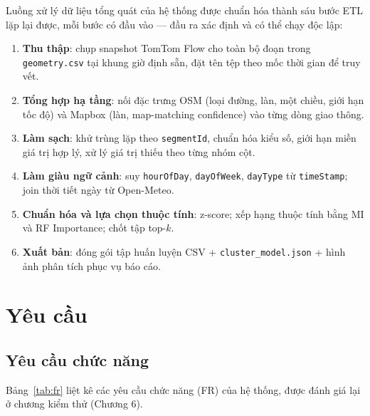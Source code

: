 Luồng xử lý dữ liệu tổng quát của hệ thống được chuẩn hóa thành sáu bước ETL lặp lại được, mỗi bước có đầu vào --- đầu ra xác định và có thể chạy độc lập:
\begin{enumerate}[label=\textbf{Bước \arabic*.},leftmargin=2.2cm,itemsep=1pt]
 \item \textbf{Thu thập}: chụp snapshot TomTom Flow cho toàn bộ đoạn trong \texttt{geometry.csv} tại khung giờ định sẵn, đặt tên tệp theo mốc thời gian để truy vết.
 \item \textbf{Tổng hợp hạ tầng}: nối đặc trưng OSM (loại đường, làn, một chiều, giới hạn tốc độ) và Mapbox (làn, map-matching confidence) vào từng dòng giao thông.
 \item \textbf{Làm sạch}: khử trùng lặp theo \texttt{segmentId}, chuẩn hóa kiểu số, giới hạn miền giá trị hợp lý, xử lý giá trị thiếu theo từng nhóm cột.
 \item \textbf{Làm giàu ngữ cảnh}: suy \texttt{hourOfDay}, \texttt{dayOfWeek}, \texttt{dayType} từ \texttt{timeStamp}; join thời tiết ngày từ Open-Meteo.
 \item \textbf{Chuẩn hóa và lựa chọn thuộc tính}: z-score; xếp hạng thuộc tính bằng MI và RF Importance; chốt tập top-$k$.
 \item \textbf{Xuất bản}: đóng gói tập huấn luyện CSV + \texttt{cluster\_model.json} + hình ảnh phân tích phục vụ báo cáo.
\end{enumerate}

\section{Yêu cầu}

\subsection{Yêu cầu chức năng}
Bảng~\ref{tab:fr} liệt kê các yêu cầu chức năng (FR) của hệ thống, được đánh giá lại ở chương kiểm thử (Chương 6).

